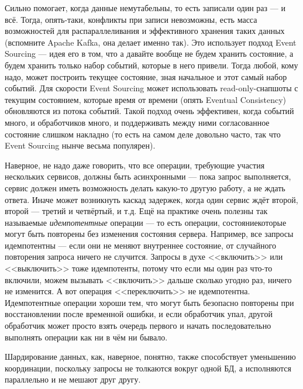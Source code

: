\documentclass[a5paper]{article}
\begin{document}
Сильно помогает, когда данные немутабельны, то есть записали один раз --- и всё. Тогда, опять-таки, конфликты при записи невозможны, есть масса возможностей для распараллеливания и эффективного хранения таких данных (вспомните Apache Kafka, она делает именно так). Это использует подход Event Sourcing --- идея его в том, что а давайте вообще не будем хранить состояние, а будем хранить только набор событий, которые в него привели. Тогда любой, кому надо, может построить текущее состояние, зная начальное и этот самый набор событий. Для скорости Event Sourcing может использовать read-only-снапшоты с текущим состоянием, которые время от времени (опять Eventual Consistency) обновляются из потока событий. Такой подход очень эффективен, когда событий много, и обработчиков много, и поддерживать между ними согласованное состояние слишком накладно (то есть на самом деле довольно часто, так что Event Sourcing нынче весьма популярен).

Наверное, не надо даже говорить, что все операции, требующие участия нескольких сервисов, должны быть асинхронными --- пока запрос выполняется, сервис должен иметь возможность делать какую-то другую работу, а не ждать ответа. Иначе может возникнуть каскад задержек, когда один сервис ждёт второй, второй --- третий и четвёртый, и т.д. Ещё на практике очень полезны так называемые \emph{идемпотентные} операции --- то есть операции, состояниекоторые могут быть повторены без изменения состояния сервера. Например, все запросы идемпотентны --- если они не меняют внутреннее состояние, от случайного повторения запроса ничего не случится. Запросы в духе <<включить>> или <<выключить>> тоже идемпотенты, потому что если мы один раз что-то включили, можем вызывать <<включить>> дальше сколько угодно раз, ничего не изменится. А вот операция <<переключить>> не идемпотентна. Идемпотентные операции хороши тем, что могут быть безопасно повторены при восстановлении после временной ошибки, и если обработчик упал, другой обработчик может просто взять очередь первого и начать последовательно выполнять операции как ни в чём ни бывало.

Шардирование данных, как, наверное, понятно, также способствует уменьшению координации, поскольку запросы не толкаются вокруг одной БД, а исполняются параллельно и не мешают друг другу.
\end{document}
